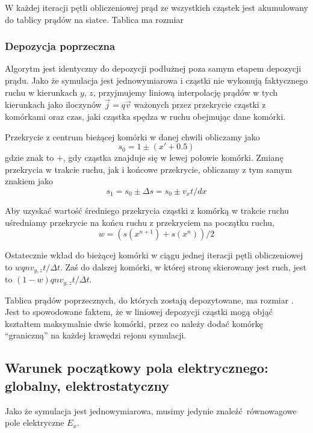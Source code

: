 W każdej iteracji pętli obliczeniowej prąd ze wszystkich cząstek jest
akumulowany do tablicy prądów na siatce. Tablica ma rozmiar  

\subsubsection{Depozycja poprzeczna}
Algorytm jest identyczny do depozycji podłużnej poza samym etapem depozycji
prądu. Jako że symulacja jest jednowymiarowa i cząstki nie wykonują
faktycznego ruchu w kierunkach $y$, $z$, przyjmujemy liniową interpolację
prądów w tych kierunkach jako iloczynów $\vec{j}=q\vec{v}$ ważonych przez przekrycie
cząstki z komórkami oraz czas, jaki cząstka spędza w ruchu obejmując dane
komórki.

Przekrycie z centrum bieżącej komórki w danej chwili obliczamy jako
\begin{equation}
    s_0 = 1 \pm (x' + 0.5) 
\end{equation}
gdzie znak to $+$, gdy cząstka znajduje się w lewej połowie komórki. Zmianę
przekrycia w trakcie ruchu, jak i końcowe przekrycie, obliczamy z tym samym znakiem jako 
\begin{equation}
    s_1 = s_0 \pm \Delta s = s_0 \pm v_x t / dx
\end{equation}


Aby uzyskać wartość średniego przekrycia cząstki z komórką w trakcie ruchu
uśredniamy przekrycie na końcu ruchu z przekryciem na początku ruchu,
\begin{equation}
    w = \left(s(x^{n+1}) + s(x^n)\right)/{2}
\end{equation}

Ostatecznie wkład do bieżącej komórki w ciągu jednej iteracji pętli obliczeniowej
to $w q n v_{y, z} t / \Delta t$.
Zaś do dalszej komórki, w której stronę skierowany jest ruch, jest to  $(1-w) q n v_{y, z} t / \Delta t$.

Tablica prądów poprzecznych, do których zostają depozytowane, ma rozmiar
. Jest to spowodowane faktem, że w liniowej depozycji
cząstki mogą objąć kształtem maksymalnie dwie komórki, przez co należy dodać
komórkę ``graniczną'' na każdej krawędzi rejonu symulacji.

\subsection{Warunek początkowy pola elektrycznego:  globalny, elektrostatyczny}
Jako że symulacja jest jednowymiarowa, musimy jedynie znaleźć równowagowe pole
elektryczne $E_x$.

